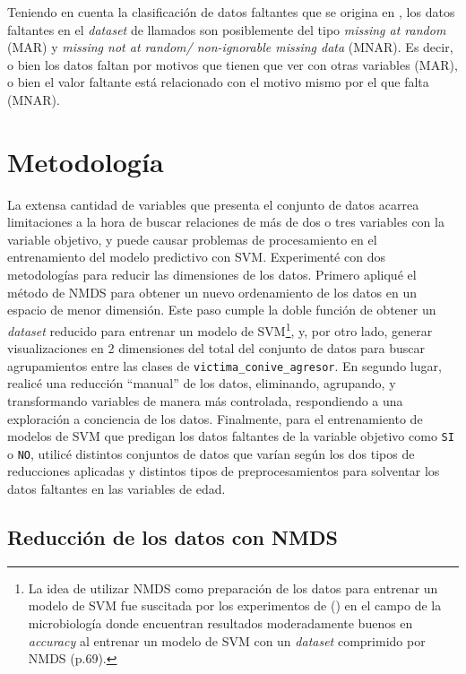 \documentclass[10 pt]{article}
\begin{document}
Teniendo en cuenta la clasificación de datos faltantes que se origina en \citet{rubin1976inference}, los datos faltantes en el \textit{dataset} de llamados son posiblemente del tipo \textit{missing at random} (MAR) y \textit{missing not at random/ non-ignorable missing data} (MNAR). Es decir, o bien los datos faltan por motivos que tienen que ver con otras variables (MAR), o bien el valor faltante está relacionado con el motivo mismo por el que falta (MNAR).    


\section{Metodología}\label{met}

La extensa cantidad de variables que presenta el conjunto de datos acarrea limitaciones a la hora de buscar relaciones de más de dos o tres variables con la variable objetivo, y puede causar problemas de procesamiento en el entrenamiento del modelo predictivo con SVM. Experimenté con dos metodologías para reducir las dimensiones de los datos. Primero apliqué el método de NMDS para obtener un nuevo ordenamiento de los datos en un espacio de menor dimensión. Este paso cumple la doble función de obtener un \textit{dataset} reducido para entrenar un modelo de SVM\footnote{La idea de utilizar NMDS como preparación de los datos para entrenar un modelo de SVM fue suscitada por los experimentos de \citeauthor{cai2019incorporating}(\citeyear{cai2019incorporating}) en el campo de la microbiología donde encuentran resultados moderadamente buenos en \textit{accuracy} al entrenar un modelo de SVM con un \textit{dataset} comprimido por NMDS (p.69).}, y, por otro lado, generar visualizaciones en 2 dimensiones del total del conjunto de datos para buscar agrupamientos entre las clases de \texttt{victima\_conive\_agresor}. En segundo lugar, realicé una reducción “manual” de los datos, eliminando, agrupando, y transformando variables de manera más controlada, respondiendo a una exploración a conciencia de los datos. Finalmente, para el entrenamiento de modelos de SVM que predigan los datos faltantes de la variable objetivo como \texttt{SI} o \texttt{NO}, utilicé distintos conjuntos de datos que varían según los dos tipos de reducciones aplicadas y distintos tipos de preprocesamientos para solventar los datos faltantes en las variables de edad.


\subsection{Reducción de los datos con NMDS}\label{NMDS}
\end{document}
